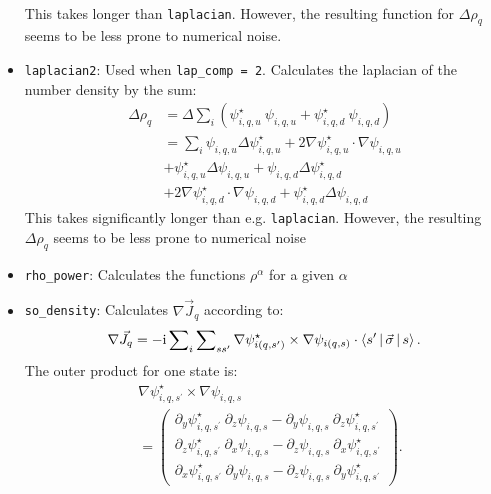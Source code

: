 \documentclass[4p]{elsarticle}
\begin{document}
\begin{itemize}
\begin{align}
\end{align}     
This takes longer than \texttt{laplacian}. However, the resulting function for $\Delta \rho_q$ seems to be less prone to numerical noise.
\item \texttt{laplacian2}: Used when \texttt{lap\_comp = 2}. Calculates the laplacian of the number density by the sum:
\begin{align}
\Delta \rho_q &= \Delta \sum\nolimits_i \left( \psi^{\star}_{i,q,u} \: \psi_{i,q,u} +  \psi^{\star}_{i,q,d} \: \psi_{i,q,d} \right) \\
&= \sum\nolimits_i   \psi_{i,q,u}  \Delta \psi^{\star}_{i,q,u} + 2 \nabla \psi^{\star}_{i,q,u} \cdot \nabla \psi_{i,q,u} \nonumber\\
                      &+ \psi^{\star}_{i,q,u}  \Delta \psi_{i,q,u} + \psi_{i,q,d}  \Delta \psi^{\star}_{i,q,d}  \nonumber\\
                      &+ 2 \nabla \psi^{\star}_{i,q,d} \cdot \nabla \psi_{i,q,d} + \psi^{\star}_{i,q,d}   \Delta \psi_{i,q,d}
\end{align}
This takes significantly longer than e.g. \texttt{laplacian}. However, the resulting $\Delta \rho_q$ seems to be less prone to numerical noise
\item \texttt{rho\_power}: Calculates the functions $\rho^\alpha$ for a given $\alpha$
\item \texttt{so\_density}: Calculates $\nabla \vec{J}_q$ according to:
\begin{align}
\nabla \vec{J}_q = -\mathrm{i} \sum\nolimits_i \sum\nolimits_{s s^\prime} \nabla \psi_{i(q,s^\prime)}^\star \times \nabla \psi_{i(q,s)} \cdot \Braket{ s^\prime  | \vec{\sigma} | s} .
\label{divJ}
\end{align}
The outer product for one state is:
\begin{align}
&\nabla \psi_{i,q,s^\prime}^\star \times \nabla \psi_{i,q,s} \nonumber\\
&= 
 \begin{pmatrix}
  \partial_y \psi_{i,q,s^\prime}^\star \: \partial_z \psi_{i,q,s} - \partial_y \psi_{i,q,s} \: \partial_z \psi_{i,q,s^\prime}^\star  \\
  \partial_z \psi_{i,q,s^\prime}^\star \: \partial_x \psi_{i,q,s} - \partial_z \psi_{i,q,s} \: \partial_x \psi_{i,q,s^\prime}^\star  \\
  \partial_x \psi_{i,q,s^\prime}^\star \: \partial_y \psi_{i,q,s} - \partial_z \psi_{i,q,s} \: \partial_y \psi_{i,q,s^\prime}^\star 
 \end{pmatrix}.

\end{align}
\end{itemize}
\end{document}
